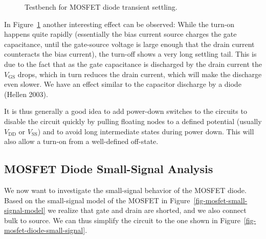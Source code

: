 \documentclass[
  a4paper,
  DIV=11,
  numbers=noendperiod]{scrartcl}
\begin{document}
\begin{figure}


\caption{\label{fig-mosfet-diode-settling-tb}Testbench for MOSFET diode
transient settling.}

\end{figure}%

In Figure~\ref{fig-mosfet-diode-settling-tb} another interesting effect
can be observed: While the turn-on happens quite rapidly (essentially
the bias current source charges the gate capacitance, until the
gate-source voltage is large enough that the drain current counteracts
the bias current), the turn-off shows a very long settling tail. This is
due to the fact that as the gate capacitance is discharged by the drain
current the \(V_\mathrm{GS}\) drops, which in turn reduces the drain
current, which will make the discharge even slower. We have an effect
similar to the capacitor discharge by a diode (Hellen 2003).

It is thus generally a good idea to add power-down switches to the
circuits to disable the circuit quickly by pulling floating nodes to a
defined potential (usually \(V_\mathrm{DD}\) or \(V_\mathrm{SS}\)) and
to avoid long intermediate states during power down. This will also
allow a turn-on from a well-defined off-state.

\subsection{MOSFET Diode Small-Signal
Analysis}\label{mosfet-diode-small-signal-analysis}

We now want to investigate the small-signal behavior of the MOSFET
diode. Based on the small-signal model of the MOSFET in
Figure~\ref{fig-mosfet-small-signal-model} we realize that gate and
drain are shorted, and we also connect bulk to source. We can thus
simplify the circuit to the one shown in
Figure~\ref{fig-mosfet-diode-small-signal}.
\end{document}
